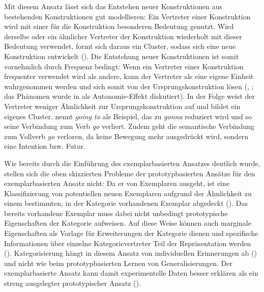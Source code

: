 Mit diesem Ansatz lässt sich das Entstehen neuer Konstruktionen aus bestehenden Konstruktionen gut modellieren: Ein Vertreter einer Konstruktion wird mit einer für die Konstruktion besonderen Bedeutung genutzt. Wird derselbe oder ein ähnlicher Vertreter der Konstruktion wiederholt mit dieser Bedeutung verwendet, formt sich daraus ein Cluster, sodass sich eine neue Konstruktion entwickelt (\cite[63]{Bybee.2013}).  Die Entstehung neuer Konstruktionen ist somit vornehmlich durch Frequenz bedingt: Wenn ein Vertreter einer Konstruktion frequenter verwendet wird als andere, kann der Vertreter als eine eigene Einheit wahrgenommen werden und sich somit von der Ursprungskonstruktion lösen (\cite[720]{Bybee.2006b}, \cite[68--70]{Goldberg.2019}; das Phänomen wurde in  als Autonomie-Effekt diskutiert). In der Folge weist der Vertreter weniger Ähnlichkeit zur Ursprungskonstruktion auf und bildet ein eigenes Cluster. \textcite[719--721]{Bybee.2006b} nennt \textit{going to} als Beispiel, das zu \textit{gonna} reduziert wird und so seine Verbindung zum Verb \textit{go} verliert. Zudem geht die semantische Verbindung zum Vollverb \textit{go} verloren, da keine Bewegung mehr ausgedrückt wird, sondern eine Intention bzw. Futur. 

Wie bereits durch die Einführung des exemplarbasierten Ansatzes deutlich wurde, stellen sich die oben skizzierten Probleme der prototypbasierten Ansätze für den exemplarbasierten Ansatz nicht: Da er von Exemplaren ausgeht, ist eine Klassifizierung von potentiellen neuen Exemplaren aufgrund der Ähnlichkeit zu einem bestimmten, in der Kategorie vorhandenen Exemplar abgedeckt (\cite[214]{Ross.1999}). Das bereits vorhandene Exemplar muss dabei nicht unbedingt prototypische Eigenschaften der Kategorie aufweisen. Auf diese Weise können auch marginale Eigenschaften als Vorlage für Erweiterungen der Kategorie dienen und spezifische Informationen über einzelne Kategorievertreter Teil der Repräsenta\-tion werden (\cite[717]{Bybee.2006b}). Kategorisierung hängt in diesem Ansatz von individuellen Erinnerungen ab (\cite[13]{Diessel.2017}) und nicht wie beim prototypbasierten Lernen von Generalisierungen. Der exemplarbasierte Ansatz kann damit experimentelle Daten besser erklären als ein streng ausgelegter prototypischer Ansatz (\cite[215]{Ross.1999}).


